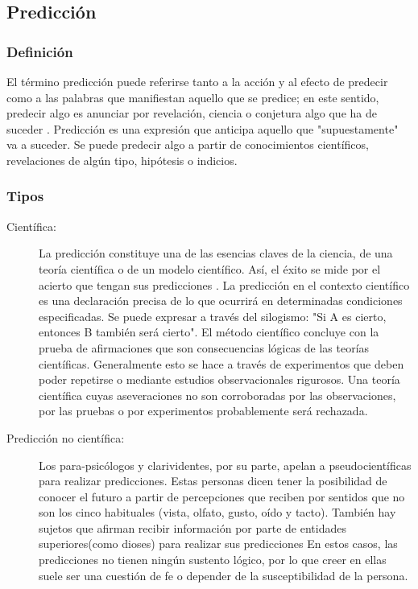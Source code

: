 \subsection{Predicción}

\subsubsection{Definición}

El término predicción puede referirse tanto a la acción y al efecto de predecir como a las palabras que manifiestan aquello que se predice; en este sentido, predecir algo es anunciar por revelación, ciencia o conjetura algo que ha de suceder \citep{rae_prediccion}.
\vskip 0.2cm 
Predicción es una expresión que anticipa aquello que "supuestamente" va a suceder. Se puede predecir algo a partir de conocimientos científicos, revelaciones de algún tipo, hipótesis o indicios.

\subsubsection{Tipos}

\begin{description}
	\item [Científica:]
	\vskip 0.1cm 
	La predicción constituye una de las esencias claves de la ciencia, de una teoría científica o de un modelo científico. Así, el éxito se mide por el acierto que tengan sus predicciones \citep{mora_prediccion}.
	\vskip 0.1cm 
	La  predicción  en  el  contexto  científico  es  una  declaración  precisa  de  lo  que  ocurrirá  en determinadas  condiciones  especificadas.  Se  puede  expresar  a  través  del  silogismo:  "Si  A  es cierto, entonces B también será cierto".
	\vskip 0.1cm 
	El método científico concluye con la prueba de afirmaciones que son consecuencias lógicas de las teorías científicas. Generalmente esto se hace a través de experimentos que deben poder repetirse o mediante estudios observacionales rigurosos.
	\vskip 0.1cm 
	Una teoría científica cuyas aseveraciones no son corroboradas por las observaciones, por las pruebas o por experimentos probablemente será rechazada.
	 
	\item [Predicción no científica:]
	\vskip 0.1cm 
	Los para-psicólogos y clarividentes, por su parte, apelan a pseudocientíficas para realizar predicciones. Estas personas dicen tener la posibilidad de conocer el futuro a partir de percepciones que reciben por sentidos que no son los cinco habituales (vista, olfato, gusto, oído y tacto). También hay sujetos que afirman recibir información por parte de entidades superiores(como dioses) para realizar sus predicciones \citep{julian_maria}
	\vskip 0.1cm 
	En estos casos, las predicciones no tienen ningún sustento lógico, por lo que creer en ellas suele ser una cuestión de fe o depender de la susceptibilidad de la persona.
	
\end{description}	
	

